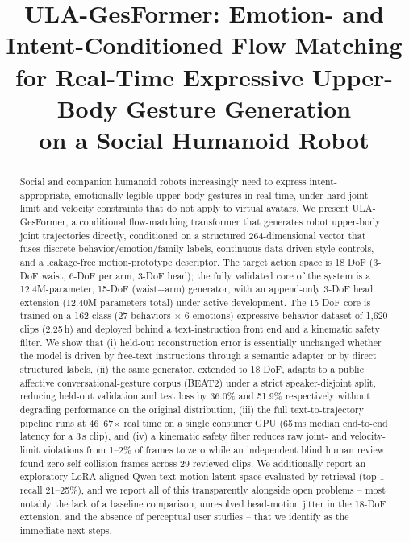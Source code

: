 \documentclass[conference]{IEEEtran}
\newcommand{\todo}[1]{\textcolor{red}{[TODO: #1]}}
\begin{document}
\title{ULA-GesFormer: Emotion- and Intent-Conditioned Flow Matching \\
for Real-Time Expressive Upper-Body Gesture Generation \\
on a Social Humanoid Robot}

\author{\IEEEauthorblockN{\todo{Author Name(s)}}
\IEEEauthorblockA{\todo{Department / Lab, Institution}\\
\todo{City, Country}\\
\todo{email@institution.edu}}}

\maketitle

\begin{abstract}
Social and companion humanoid robots increasingly need to express
intent-appropriate, emotionally legible upper-body gestures in real time,
under hard joint-limit and velocity constraints that do not apply to
virtual avatars. We present ULA-GesFormer, a conditional flow-matching
transformer that generates robot upper-body joint trajectories directly,
conditioned on a structured 264-dimensional vector that fuses discrete
behavior/emotion/family labels, continuous data-driven style controls,
and a leakage-free motion-prototype descriptor. The target action space
is 18 DoF (3-DoF waist, 6-DoF per arm, 3-DoF head); the fully validated
core of the system is a 12.4M-parameter, 15-DoF (waist+arm) generator,
with an append-only 3-DoF head extension (12.40M parameters total)
under active development. The 15-DoF core is trained on a 162-class
(27 behaviors $\times$ 6 emotions) expressive-behavior dataset of
1{,}620 clips (2.25\,h) and deployed behind a text-instruction front end
and a kinematic safety filter. We show that (i) held-out reconstruction
error is essentially unchanged whether the model is driven by free-text
instructions through a semantic adapter or by direct structured labels,
(ii) the same generator, extended to 18 DoF, adapts to a public
affective conversational-gesture corpus (BEAT2) under a strict
speaker-disjoint split, reducing held-out validation and test loss by
36.0\% and 51.9\% respectively without degrading performance on the
original distribution, (iii) the full text-to-trajectory pipeline runs
at 46--67$\times$ real time on a single consumer GPU (65\,ms median
end-to-end latency for a 3\,s clip), and (iv) a kinematic safety filter
reduces raw joint- and velocity-limit violations from 1--2\% of frames
to zero while an independent blind human review found zero
self-collision frames across 29 reviewed clips. We additionally report
an exploratory LoRA-aligned Qwen text-motion latent space evaluated by
retrieval (top-1 recall 21--25\%), and we report all of this
transparently alongside open problems -- most notably the lack of a
baseline comparison, unresolved head-motion jitter in the 18-DoF
extension, and the absence of perceptual user studies -- that we
identify as the immediate next steps.
\end{abstract}
\end{document}
